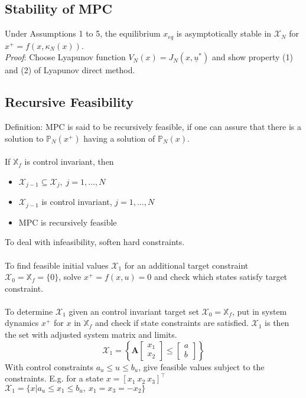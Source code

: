 \documentclass[english]{latex4ei/latex4ei_sheet}
\begin{document}
\begin{sectionbox}
\subsection{Stability of MPC}
Under Assumptions 1 to 5, the equilibrium $x_{eq}$ is asymptotically stable in $\mathcal{X}_N$ for $x^{+}=f(x,\kappa_{N}(x))$.
\vspace{0.1cm}\\
\textit{Proof}: Choose Lyapunov function $V_N(x)=J_N(x,\underline{u}^{*})$ and show property (1) and (2) of Lyapunov direct method.\\

\subsection{Recursive Feasibility}
Definition: MPC is said to be recursively feasible, if one can assure that there is a solution to $\mathbb{P}_N(x^{+})$ having a solution of $\mathbb{P}_N(x)$.\\
\\
If $\mathbb{X}_f$ is control invariant, then
\begin{itemize}
    \item $\mathcal{X}_{j-1}\subseteq\mathcal{X}_{j},\;j=1,\ldots,N$
    \item $\mathcal{X}_{j-1}$ is control invariant, $j=1,\ldots,N$
    \item MPC is recursively feasible
\end{itemize}
To deal with infeasibility, soften hard constraints.\\
\\
To find feasible initial values $\mathcal{X}_1$ for an additional target constraint $\mathcal{X}_0=\mathbb{X}_f=\{0\}$, solve $x^{+}=f(x,u)=0$ and check which states satisfy target constraint.\\
\\
To determine $\mathcal{X}_1$ given an control invariant target set $\mathcal{X}_0=\mathbb{X}_f$, put in system dynamics $x^{+}$ for $x$ in $\mathbb{X}_f$ and check if state constraints are satisfied. $\mathcal{X}_1$ is then the set with adjusted system matrix and limits.
$$\mathcal{X}_1=\left\{\mathbf{A}\begin{bmatrix}x_1 \\ x_2 \end{bmatrix}\leq\begin{bmatrix}a \\ b \end{bmatrix}\right\}$$
With control constraints $a_u\leq u\leq b_u$, give feasible values subject to the constraints. E.g. for a state $x=\left[x_1\ x_2\ x_3\right]^{\top}$\\ $\mathcal{X}_1=\{x| a_u \leq x_1 \leq b_u,\ x_1=x_3=-x_2\}$

\end{sectionbox}
\end{document}
